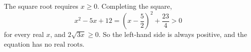 The square root requires $x\ge0$. Completing the square,
\[
x^2-5x+12=\left(x-\dfrac{5}{2}\right)^2+\dfrac{23}{4}>0
\]
for every real $x$, and $2\sqrt{3x}\ge0$. So the left-hand side is always positive, and the equation has $\boxed{\text{no real roots}}$.
